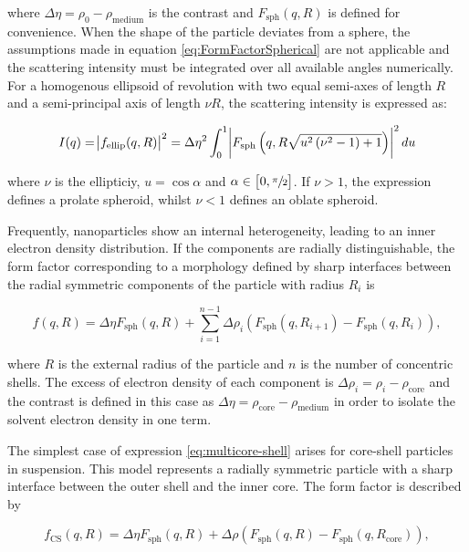 where $\Delta \eta = \rho_0 - \rho_{\text{medium}}$ is the contrast and $ F_{\text{sph}}(q,R)$ is defined for convenience. When the shape of the particle deviates from a sphere, the assumptions made in equation \ref{eq:FormFactorSpherical} are not applicable and the scattering intensity must be integrated over all available angles numerically. For a homogenous ellipsoid of revolution with two equal semi-axes of length $R$ and a semi-principal axis of length $\nu R $, the scattering intensity is expressed as:

\begin{equation}
        \label{eq:ff_ellipsoid}
       I(q) = \abs{ f_{\text{ellip}}(q,R) }^2 = \Delta \eta^2 \int_0^1 \abs{F_{\text{sph}}\left( q,R \sqrt{u^2\left( \nu^2 -1 \right) + 1} \right)}^2 du 
\end{equation}

where $\nu$ is the ellipticiy, $u = \cos{\alpha}$ and $\alpha \in \left[  0, \sfrac{\pi}{2} \right]$. If $\nu > 1$, the expression defines a prolate spheroid, whilst $\nu < 1$ defines an oblate spheroid.

Frequently, nanoparticles show an internal heterogeneity, leading to an inner electron density distribution. If the components are radially distinguishable, the form factor corresponding to a morphology defined by sharp interfaces between the radial symmetric components of the particle with radius \(R_i\) is

\begin{equation}
\label{eq:multicore-shell}
f\left(q,R \right)= \Delta \eta F_{\text{sph}}(q,R)+\sum_{i=1}^{n-1} \Delta\rho_i \left( F_{\text{sph}}(q,R_{i+1})-F_{\text{sph}}(q,R_{i}) \right) ,
\end{equation}

where \(R\) is the external radius of the particle and \( n \) is the number of concentric shells. The excess of electron density of each component is $\Delta\rho_i = \rho_i - \rho_{\text{core}}$ and the contrast is defined in this case as $\Delta \eta = \rho_{\text{core}} - \rho_{\text{medium}}$ in order to isolate the solvent electron density in one term.

The simplest case of expression \ref{eq:multicore-shell} arises for core-shell particles in suspension. This model represents a radially symmetric particle with a sharp interface between the outer shell and the inner core. The form factor is described by

\begin{equation}
        \label{eq:ff_cs}
	f_{\text{CS}}(q,R)=  \Delta\eta F_{\text{sph}}(q,R) +  \Delta\rho\left( F_{\text{sph}}(q,R)-F_{\text{sph}}(q,R_{\text{core}}) \right) ,
\end{equation}

